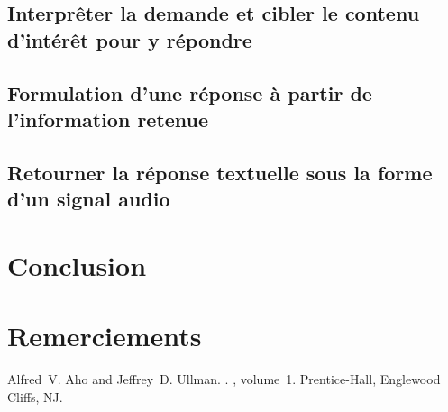 \documentclass[11pt]{article}
\begin{document}
\subsection{Interprêter la demande et cibler le contenu d'intérêt pour y répondre}

\subsection{Formulation d'une réponse à partir de l'information retenue}

\subsection{Retourner la réponse textuelle sous la forme d'un signal audio}

\section*{Conclusion}

\section*{Remerciements}

%
%

\begin{thebibliography}{}
Alfred~V. Aho and Jeffrey~D. Ullman.
.
, volume~1.
\newblock Prentice-{Hall}, Englewood Cliffs, NJ.

\end{thebibliography}
\end{document}
